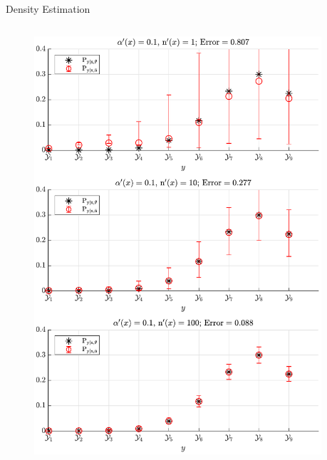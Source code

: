 \documentclass[xcolor=dvipsnames]{beamer}
\begin{document}
\begin{frame}{}
\begin{columns}[T]
\begin{column}{.34\linewidth}
\begin{block}{Density Estimation}
\begin{columns}[c]
\begin{column}{.48\linewidth}
\end{column}
\end{columns}



\vspace{1cm}



\begin{columns}[t]
\begin{column}{.5\linewidth}

\begin{figure}
\centering
\includegraphics[width=0.9\linewidth]{P_yx_error_a0_0_1.pdf}
\end{figure}

\end{column}
\begin{column}{.5\linewidth}


\end{column}
\end{columns}
\end{block}
\end{column}
\end{columns}
\end{frame}
\end{document}
